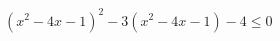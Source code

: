 \begin{ex}[type=inequality]
	\begin{condition}
		\( (x^2-4x-1)^2-3(x^2-4x-1)-4\le0 \)
	\end{condition}
	\answer{\( [-1;0]\cup[4;5] \)}
\end{ex}